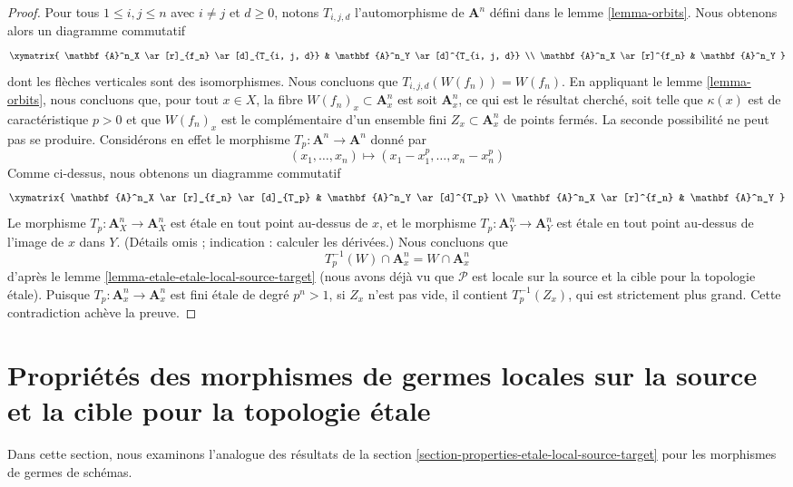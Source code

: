 \begin{proof}
\medskip\noindent
Pour tous $1 \leq i, j \leq n$ avec $i \not = j$ et $d \geq 0$, notons
$T_{i, j, d}$ l'automorphisme de $\mathbf{A}^n$ défini dans le
lemme \ref{lemma-orbits}. Nous obtenons alors un diagramme commutatif
$$
\xymatrix{
\mathbf{A}^n_X \ar[r]_{f_n} \ar[d]_{T_{i, j, d}} &
\mathbf{A}^n_Y \ar[d]^{T_{i, j, d}} \\
\mathbf{A}^n_X \ar[r]^{f_n} & \mathbf{A}^n_Y
}
$$
dont les flèches verticales sont des isomorphismes. Nous concluons que
$T_{i, j, d}(W(f_n)) = W(f_n)$. En appliquant le lemme \ref{lemma-orbits}, nous
concluons que, pour tout $x \in X$, la fibre
$W(f_n)_x \subset \mathbf{A}^n_x$ est soit $\mathbf{A}^n_x$, ce qui est le
résultat cherché, soit telle que $\kappa(x)$ est de caractéristique $p > 0$ et
que $W(f_n)_x$ est le complémentaire d'un ensemble fini
$Z_x \subset \mathbf{A}^n_x$ de points fermés. La seconde possibilité ne peut
pas se produire. Considérons en effet le morphisme
$T_p : \mathbf{A}^n \to \mathbf{A}^n$ donné par
$$
(x_1, \ldots, x_n) \mapsto (x_1 - x_1^p, \ldots, x_n - x_n^p)
$$
Comme ci-dessus, nous obtenons un diagramme commutatif
$$
\xymatrix{
\mathbf{A}^n_X \ar[r]_{f_n} \ar[d]_{T_p} &
\mathbf{A}^n_Y \ar[d]^{T_p} \\
\mathbf{A}^n_X \ar[r]^{f_n} & \mathbf{A}^n_Y
}
$$
Le morphisme $T_p : \mathbf{A}^n_X \to \mathbf{A}^n_X$ est \'etale en tout
point au-dessus de $x$, et le morphisme
$T_p : \mathbf{A}^n_Y \to \mathbf{A}^n_Y$ est \'etale en tout point au-dessus
de l'image de $x$ dans $Y$. (Détails omis ; indication : calculer les
dérivées.) Nous concluons que
$$
T_p^{-1}(W) \cap \mathbf{A}^n_x = W \cap \mathbf{A}^n_x
$$
d'après le lemme \ref{lemma-etale-etale-local-source-target} (nous avons déjà
vu que $\mathcal{P}$ est locale sur la source et la cible pour la topologie
\'etale). Puisque $T_p : \mathbf{A}^n_x \to \mathbf{A}^n_x$ est fini \'etale de
degré $p^n > 1$, si $Z_x$ n'est pas vide, il contient $T_p^{-1}(Z_x)$, qui est
strictement plus grand. Cette contradiction achève la preuve.
\end{proof}





\section[Morphismes de germes : localité étale]{Propriétés des morphismes de germes locales sur la source et la cible
pour la topologie étale}
\label{section-local-source-target-at-point}

\noindent
Dans cette section, nous examinons l'analogue des résultats de la
section \ref{section-properties-etale-local-source-target}
pour les morphismes de germes de schémas.

